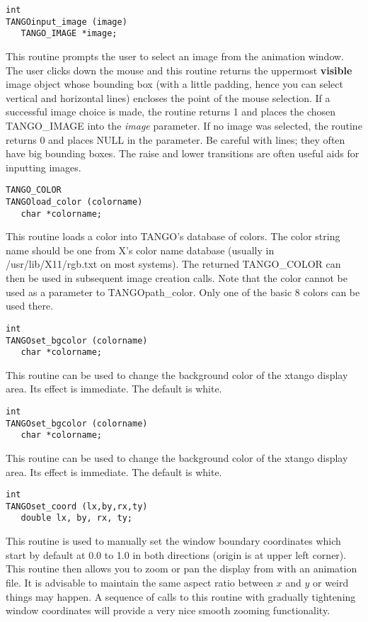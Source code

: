 \vspace{1em}
\begin{verbatim}
int
TANGOinput_image (image) 
   TANGO_IMAGE *image;
\end{verbatim}
This routine prompts the user to select an image from the animation
window.  The user clicks down the mouse and this routine returns the
uppermost {\bf visible} image object whose bounding box (with a little
padding, hence you can select vertical and horizontal lines) encloses
the point of the mouse selection. If a successful image choice is
made, the routine returns 1 and places the chosen TANGO\_IMAGE into
the {\em image} parameter.  If no image was selected, the routine
returns 0 and places NULL in the parameter.  Be careful with lines;
they often have big bounding boxes.  The raise and lower transitions
are often useful aids for inputting images.

\vspace{1em}
\begin{verbatim}
TANGO_COLOR
TANGOload_color (colorname)
   char *colorname;
\end{verbatim}
This routine loads a color into TANGO's database of colors.  The color
string name should be one from X's color name database (usually in
/usr/lib/X11/rgb.txt on most systems).  The returned TANGO\_COLOR can
then be used in subsequent image creation calls.  Note that the color
cannot be used as a parameter to TANGOpath\_color.  Only one of the
basic 8 colors can be used there.

\vspace{1em}
\begin{verbatim}
int
TANGOset_bgcolor (colorname) 
   char *colorname;
\end{verbatim}
This routine can be used to change the background color of the xtango
display area.  Its effect is immediate.  The default is white.

\vspace{1em}
\begin{verbatim}
int
TANGOset_bgcolor (colorname) 
   char *colorname;
\end{verbatim}
This routine can be used to change the background color of the xtango
display area.  Its effect is immediate.  The default is white.

\vspace{1em}
\begin{verbatim}
int
TANGOset_coord (lx,by,rx,ty) 
   double lx, by, rx, ty;
\end{verbatim}
This routine is used to manually set the window boundary coordinates
which start by default at 0.0 to 1.0 in both directions (origin is at
upper left corner).  This routine then allows you to zoom or pan the
display from with an animation file.  It is advisable to maintain the
same aspect ratio between $x$ and $y$ or weird things may happen.  A
sequence of calls to this routine with gradually tightening window
coordinates will provide a very nice smooth zooming functionality.

